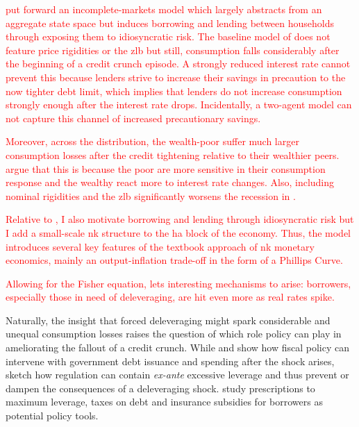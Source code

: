 \documentclass[12pt]{article} %
\numberwithin{equation}{section} %
\numberwithin{figure}{section}
\numberwithin{table}{section}
\begin{document}
\textcolor{red}{\textcite{gl2017} put forward an incomplete-markets model which largely abstracts from an aggregate state space but induces borrowing and lending between households through exposing them to idiosyncratic risk. The baseline model of \textcite{gl2017} does not feature price rigidities or the \Gls{zlb} but still, consumption falls considerably after the beginning of a credit crunch episode. A strongly reduced interest rate cannot prevent this because lenders strive to increase their savings in precaution to the now tighter debt limit, which implies that lenders do not increase consumption strongly enough after the interest rate drops. Incidentally, a two-agent model can not capture this channel of increased precautionary savings.}

\textcolor{red}{Moreover, across the distribution, the wealth-poor suffer much larger consumption losses after the credit tightening relative to their wealthier peers. \textcite{gl2017} argue that this is because the poor are more sensitive in their consumption response and the wealthy react more to interest rate changes. Also, including nominal rigidities and the \Gls{zlb} significantly worsens the recession in \textcite{gl2017}.}

\textcolor{red}{Relative to \textcite{gl2017}, I also motivate borrowing and lending through idiosyncratic risk but I add a small-scale \Gls{nk} structure to the \Gls{ha} block of the economy. Thus, the model introduces several key features of the textbook approach of \Gls{nk} monetary economics, mainly an output-inflation trade-off in the form of a Phillips Curve.} 

\textcolor{red}{Allowing for the Fisher equation, lets interesting mechanisms to arise: borrowers, especially those in need of deleveraging, are hit even more as real rates spike.}


Naturally, the insight that forced deleveraging might spark considerable and unequal consumption losses raises the question of which role policy can play in ameliorating the fallout of a credit crunch. While \textcite{egg2012} and \textcite{gl2017} show how fiscal policy can intervene with government debt issuance and spending after the shock arises, \textcite{korinek2016} sketch how regulation can contain \textit{ex-ante} excessive leverage and thus prevent or dampen the consequences of a deleveraging shock. \textcite{korinek2016} study prescriptions to maximum leverage, taxes on debt and insurance subsidies for borrowers as potential policy tools.
\end{document}
